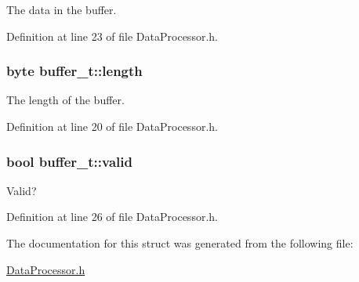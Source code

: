 \-The data in the buffer. 



\-Definition at line 23 of file \-Data\-Processor.\-h.

\hypertarget{structbuffer__t_a5f6ea3ee1957ac885233051495e45596}{
\subsubsection[{length}]{\setlength{\rightskip}{0pt plus 5cm}byte {\bf buffer\-\_\-t\-::length}}}\label{structbuffer__t_a5f6ea3ee1957ac885233051495e45596}


\-The length of the buffer. 



\-Definition at line 20 of file \-Data\-Processor.\-h.

\hypertarget{structbuffer__t_ab8c6d50976afb6e0717a0dc6e6bde41c}{
\subsubsection[{valid}]{\setlength{\rightskip}{0pt plus 5cm}bool {\bf buffer\-\_\-t\-::valid}}}\label{structbuffer__t_ab8c6d50976afb6e0717a0dc6e6bde41c}


\-Valid? 



\-Definition at line 26 of file \-Data\-Processor.\-h.



\-The documentation for this struct was generated from the following file\-:\begin{DoxyCompactItemize}
\item 
\hyperlink{_data_processor_8h}{\-Data\-Processor.\-h}\end{DoxyCompactItemize}
